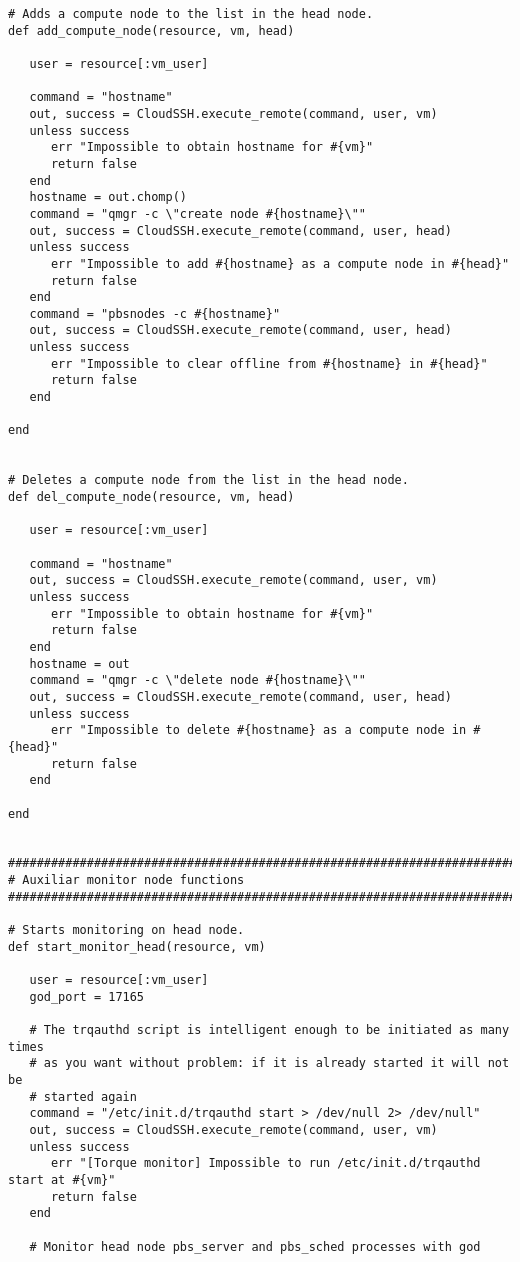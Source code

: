 \begin{lstlisting}
# Adds a compute node to the list in the head node.
def add_compute_node(resource, vm, head)

   user = resource[:vm_user]

   command = "hostname"
   out, success = CloudSSH.execute_remote(command, user, vm)
   unless success
      err "Impossible to obtain hostname for #{vm}"
      return false
   end
   hostname = out.chomp()
   command = "qmgr -c \"create node #{hostname}\""
   out, success = CloudSSH.execute_remote(command, user, head)
   unless success
      err "Impossible to add #{hostname} as a compute node in #{head}"
      return false
   end
   command = "pbsnodes -c #{hostname}"
   out, success = CloudSSH.execute_remote(command, user, head)
   unless success
      err "Impossible to clear offline from #{hostname} in #{head}"
      return false
   end
   
end


# Deletes a compute node from the list in the head node.
def del_compute_node(resource, vm, head)

   user = resource[:vm_user]
   
   command = "hostname"
   out, success = CloudSSH.execute_remote(command, user, vm)
   unless success
      err "Impossible to obtain hostname for #{vm}"
      return false
   end
   hostname = out
   command = "qmgr -c \"delete node #{hostname}\""
   out, success = CloudSSH.execute_remote(command, user, head)
   unless success
      err "Impossible to delete #{hostname} as a compute node in #{head}"
      return false
   end
   
end


################################################################################
# Auxiliar monitor node functions
################################################################################

# Starts monitoring on head node.
def start_monitor_head(resource, vm)
   
   user = resource[:vm_user]
   god_port = 17165
   
   # The trqauthd script is intelligent enough to be initiated as many times
   # as you want without problem: if it is already started it will not be
   # started again
   command = "/etc/init.d/trqauthd start > /dev/null 2> /dev/null"
   out, success = CloudSSH.execute_remote(command, user, vm)
   unless success
      err "[Torque monitor] Impossible to run /etc/init.d/trqauthd start at #{vm}"
      return false
   end
   
   # Monitor head node pbs_server and pbs_sched processes with god
   

\end{lstlisting}
